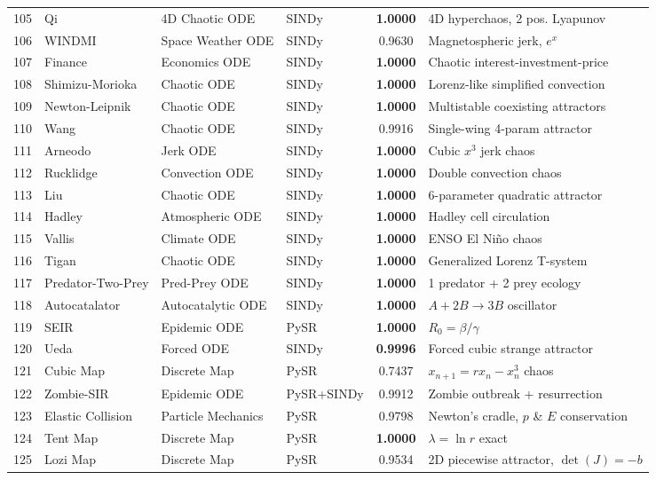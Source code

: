 \begin{table}[t]
\begin{tabular}{rlllcl}
105 & Qi & 4D Chaotic ODE & SINDy & \textbf{1.0000} & 4D hyperchaos, 2 pos. Lyapunov \\
106 & WINDMI & Space Weather ODE & SINDy & 0.9630 & Magnetospheric jerk, $e^x$ \\
107 & Finance & Economics ODE & SINDy & \textbf{1.0000} & Chaotic interest-investment-price \\
108 & Shimizu-Morioka & Chaotic ODE & SINDy & \textbf{1.0000} & Lorenz-like simplified convection \\
109 & Newton-Leipnik & Chaotic ODE & SINDy & \textbf{1.0000} & Multistable coexisting attractors \\
110 & Wang & Chaotic ODE & SINDy & 0.9916 & Single-wing 4-param attractor \\
111 & Arneodo & Jerk ODE & SINDy & \textbf{1.0000} & Cubic $x^3$ jerk chaos \\
112 & Rucklidge & Convection ODE & SINDy & \textbf{1.0000} & Double convection chaos \\
113 & Liu & Chaotic ODE & SINDy & \textbf{1.0000} & 6-parameter quadratic attractor \\
114 & Hadley & Atmospheric ODE & SINDy & \textbf{1.0000} & Hadley cell circulation \\
115 & Vallis & Climate ODE & SINDy & \textbf{1.0000} & ENSO El Ni\~{n}o chaos \\
116 & Tigan & Chaotic ODE & SINDy & \textbf{1.0000} & Generalized Lorenz T-system \\
117 & Predator-Two-Prey & Pred-Prey ODE & SINDy & \textbf{1.0000} & 1 predator + 2 prey ecology \\
118 & Autocatalator & Autocatalytic ODE & SINDy & \textbf{1.0000} & $A + 2B \to 3B$ oscillator \\
119 & SEIR & Epidemic ODE & PySR & \textbf{1.0000} & $R_0 = \beta/\gamma$ \\
120 & Ueda & Forced ODE & SINDy & \textbf{0.9996} & Forced cubic strange attractor \\
121 & Cubic Map & Discrete Map & PySR & 0.7437 & $x_{n+1} = rx_n - x_n^3$ chaos \\
122 & Zombie-SIR & Epidemic ODE & PySR+SINDy & 0.9912 & Zombie outbreak + resurrection \\
123 & Elastic Collision & Particle Mechanics & PySR & 0.9798 & Newton's cradle, $p$ \& $E$ conservation \\
124 & Tent Map & Discrete Map & PySR & \textbf{1.0000} & $\lambda = \ln r$ exact \\
125 & Lozi Map & Discrete Map & PySR & 0.9534 & 2D piecewise attractor, $\det(J) = -b$ \\

\end{tabular}
\end{table}
